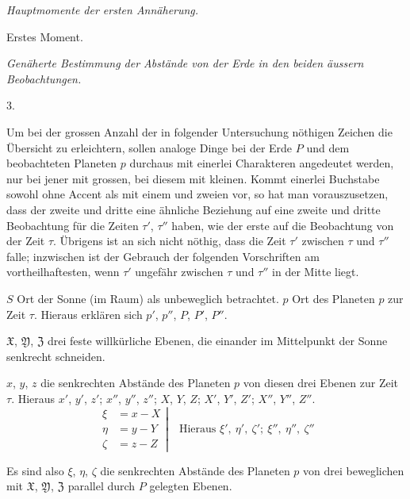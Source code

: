 \begin{center}
\emph{Hauptmomente der ersten Annäherung.}\par\medskip
Erstes Moment.\par\smallskip
\emph{Genäherte Bestimmung der Abstände von der Erde in den beiden äussern Beobachtungen.}
\end{center}
\begin{center}3.\end{center}
Um bei der grossen Anzahl der in folgender Untersuchung nöthigen Zeichen die Übersicht zu erleichtern, sollen analoge Dinge bei der Erde $P$ und dem beobachteten Planeten $p$ durchaus mit einerlei Charakteren angedeutet werden, nur bei jener mit grossen, bei diesem mit kleinen. Kommt einerlei Buchstabe sowohl ohne Accent als mit einem und zweien vor, so hat man vorauszusetzen, dass der zweite und dritte eine ähnliche Beziehung auf eine zweite und dritte Beobachtung für die Zeiten $\tau'$, $\tau''$ haben, wie der erste auf die Beobachtung von der Zeit $\tau$. Übrigens ist an sich nicht nöthig, dass die Zeit $\tau'$ zwischen $\tau$ und $\tau''$ falle; inzwischen ist der Gebrauch der folgenden Vorschriften am vortheilhaftesten, wenn $\tau'$ ungefähr zwischen $\tau$ und $\tau''$ in der Mitte liegt.

$S$ Ort der Sonne (im Raum) als unbeweglich betrachtet. $p$ Ort des Planeten $p$ zur Zeit $\tau$. Hieraus erklären sich $p'$, $p''$, $P$, $P'$, $P''$.

$\mathfrak{X}$, $\mathfrak{Y}$, $\mathfrak{Z}$ drei feste willkürliche Ebenen, die einander im Mittelpunkt der Sonne senkrecht schneiden.

$x$, $y$, $z$ die senkrechten Abstände des Planeten $p$ von diesen drei Ebenen zur Zeit $\tau$. Hieraus $x'$, $y'$, $z'$; $x''$, $y''$, $z''$; $X$, $Y$, $Z$; $X'$, $Y'$, $Z'$; $X''$, $Y''$, $Z''$.
\[
\left.\begin{aligned}
\xi&=x-X\\
\eta&=y-Y\\
\zeta&=z-Z
\end{aligned}\right|\quad\text{Hieraus }\xi',\ \eta',\ \zeta';\ \xi'',\ \eta'',\ \zeta''
\]

Es sind also $\xi$, $\eta$, $\zeta$ die senkrechten Abstände des Planeten $p$ von drei beweglichen mit $\mathfrak{X}$, $\mathfrak{Y}$, $\mathfrak{Z}$ parallel durch $P$ gelegten Ebenen.

